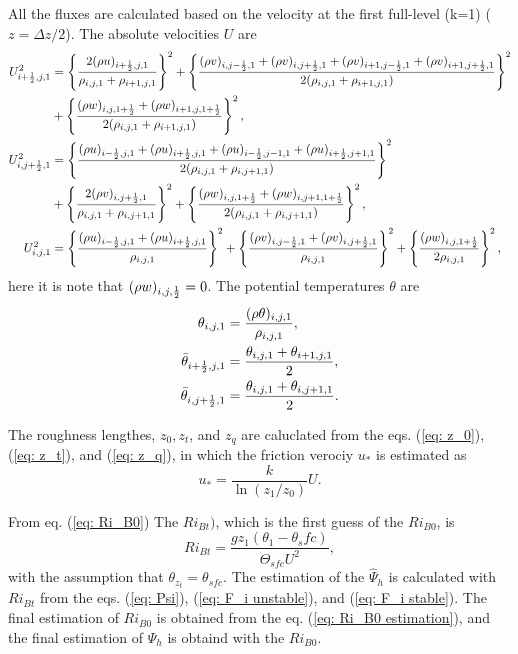All the fluxes are calculated based on the velocity at the first full-level (k=1)
($z=\Delta z/2$).
The absolute velocities $U$ are
\begin{align}
  U_{i+\half,j,1}^2 &=
    \left\{\frac{2(\rho u)_{i+\half,j,1}}{\rho_{i,j,1}+\rho_{i+1,j,1}}\right\}^2
  + \left\{\frac{(\rho v)_{i,j-\half,1} + (\rho v)_{i,j+\half,1} + (\rho v)_{i+1,j-\half,1} + (\rho v)_{i+1,j+\half,1}}{2(\rho_{i,j,1}+\rho_{i+1,j,1})}\right\}^2 \nonumber \\
 &+ \left\{\frac{(\rho w)_{i,j,1+\half} + (\rho w)_{i+1,j,1+\half}}{2(\rho_{i,j,1}+\rho_{i+1,j,1})}\right\}^2, \\
  U_{i,j+\half,1}^2 &=
    \left\{\frac{(\rho u)_{i-\half,j,1} + (\rho u)_{i+\half,j,1} + (\rho u)_{i-\half,j-1,1} + (\rho u)_{i+\half,j+1,1}}{2(\rho_{i,j,1}+\rho_{i,j+1,1})}\right\}^2 \nonumber\\
 &+ \left\{\frac{2(\rho v)_{i,j+\half,1}}{\rho_{i,j,1}+\rho_{i,j+1,1}}\right\}^2
  + \left\{\frac{(\rho w)_{i,j,1+\half} + (\rho w)_{i,j+1,1+\half}}{2(\rho_{i,j,1}+\rho_{i,j+1,1})}\right\}^2, \\
  U_{i,j,1}^2 &=
    \left\{\frac{(\rho u)_{i-\half,j,1} + (\rho u)_{i+\half,j,1}}{\rho_{i,j,1}}\right\}^2
  + \left\{\frac{(\rho v)_{i,j-\half,1} + (\rho v)_{i,j+\half,1}}{\rho_{i,j,1}}\right\}^2
  + \left\{\frac{(\rho w)_{i,j,1+\half}}{2\rho_{i,j,1}}\right\}^2,
\end{align}
here it is note that $(\rho w)_{i,j,\half}=0$.
The potential temperatures $\theta$ are
\begin{align}
  \theta_{i,j,1} &= \frac{(\rho \theta)_{i,j,1}}{\rho_{i,j,1}}, \\
  \bar{\theta}_{i+\half,j,1} &= \frac{\theta_{i,j,1}+\theta_{i+1,j,1}}{2}, \\
  \bar{\theta}_{i,j+\half,1} &= \frac{\theta_{i,j,1}+\theta_{i,j+1,1}}{2}.
\end{align}

The roughness lengthes, $z_0, z_t$, and $z_q$ are caluclated from
the eqs. (\ref{eq: z_0}), (\ref{eq: z_t}), and (\ref{eq: z_q}),
in which the friction verociy $u_*$ is estimated as
\begin{equation}
  u_* = \frac{k}{\ln(z_1/z_0)}U.
\end{equation}

From eq. (\ref{eq: Ri_B0})
The $Ri_{Bt})$, which is the first guess of the $Ri_{B0}$, is
\begin{equation}
  Ri_{Bt} = \frac{gz_1(\theta_1-\theta_sfc)}{\Theta_{sfc}U^2},
\end{equation}
with the assumption that $\theta_{z_t} = \theta_{sfc}$.
The estimation of the $\hat{\Psi}_h$ is calculated with $Ri_{Bt}$ from
the eqs. (\ref{eq: Psi}), (\ref{eq: F_i unstable}), and (\ref{eq: F_i stable}).
The final estimation of $Ri_{B0}$ is obtained from the eq. (\ref{eq: Ri_B0 estimation}),
and the final estimation of $\Psi_h$ is obtaind with the $Ri_{B0}$.

